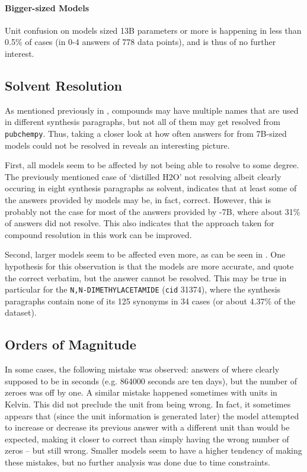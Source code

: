 \paragraph{Bigger-sized Models}
Unit confusion on models sized 13B parameters or more is happening in less than 0.5\% of cases (in 0-4 answers of 778 data points), and is thus of no further interest.


\subsection{Solvent Resolution}\label{sub:solv}
As mentioned previously in , compounds may have multiple names that are used in different synthesis paragraphs, but not all of them may get resolved from \texttt{pubchempy}.
Thus, taking a closer look at how often answers for \tsolv from 7B-sized models could not be resolved in  reveals an interesting picture.

First, all models seem to be affected by not being able to resolve \tsolv to some degree.
The previously mentioned case of `distilled H2O' not resolving albeit clearly occuring in eight synthesis paragraphs as solvent, indicates that at least some of the answers provided by models may be, in fact, correct.
However, this is probably not the case for most of the answers provided by -7B, where about 31\% of answers did not resolve.
This also indicates that the approach taken for compound resolution in this work can be improved.

Second, larger models seem to be affected even more, as can be seen in .
One hypothesis for this observation is that the models are more accurate, and quote the correct \tsolv verbatim, but the answer cannot be resolved.
This may be true in particular for the \tsolv \texttt{N,N-DIMETHYLACETAMIDE} (\texttt{cid} 31374), where the synthesis paragraphs contain none of its 125 synonyms in 34 cases (or about 4.37\% of the dataset).

\subsection{Orders of Magnitude}\label{sub:oom}
In some cases, the following mistake was observed:
answers of \ttime where clearly supposed to be in seconds (e.g. 864000 seconds are ten days), but the number of zeroes was off by one.
A similar mistake happened sometimes with \ttemp units in Kelvin.
This did not preclude the unit from being wrong.
In fact, it sometimes appears that (since the unit information is generated later) the model attempted to increase or decrease its previous answer with a different unit than would be expected, making it closer to correct than simply having the wrong number of zeros -- but still wrong.
Smaller models seem to have a higher tendency of making these mistakes, but no further analysis was done due to time constraints.



